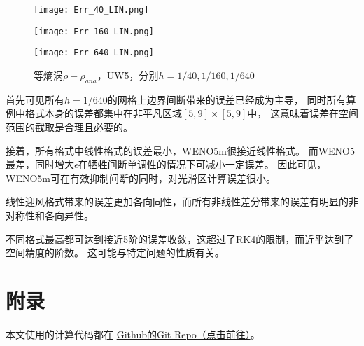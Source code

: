 \documentclass[UTF8,zihao=5]{ctexart} %
\begin{document}
\begin{figure}[H]
    \begin{minipage}[c]{0.32\linewidth}  %
        \centering
        \texttt{[image: Err\_40\_LIN.png]}  %
    \end{minipage}
    \hfill %
    \begin{minipage}[c]{0.32\linewidth}  %
        \centering
        \texttt{[image: Err\_160\_LIN.png]}  %
    \end{minipage}
    \hfill %
    \begin{minipage}[c]{0.32\linewidth}  %
        \centering
        \texttt{[image: Err\_640\_LIN.png]}  %
    \end{minipage}
    \caption{等熵涡$\rho-\rho_{ana}$，UW5，分别$h=1/40,1/160,1/640$}
\end{figure}
首先可见所有$h=1/640$的网格上边界间断带来的误差已经成为主导，
同时所有算例中格式本身的误差都集中在非平凡区域$[5,9]\times[5,9]$中，
这意味着误差在空间范围的截取是合理且必要的。

接着，所有格式中线性格式的误差最小，WENO5m很接近线性格式。
而WENO5最差，同时增大$\epsilon$在牺牲间断单调性的情况下可减小一定误差。
因此可见，WENO5m可在有效抑制间断的同时，对光滑区计算误差很小。

线性迎风格式带来的误差更加各向同性，而所有非线性差分带来的误差有明显的非对称性和各向异性。

不同格式最高都可达到接近5阶的误差收敛，这超过了RK4的限制，而近乎达到了空间精度的阶数。
这可能与特定问题的性质有关。


{}



\section*{附录}

本文使用的计算代码都在
\href{https://github.com/harryzhou2000/HW_ACFD}{Github的Git Repo（点击前往）}。























\end{document}
